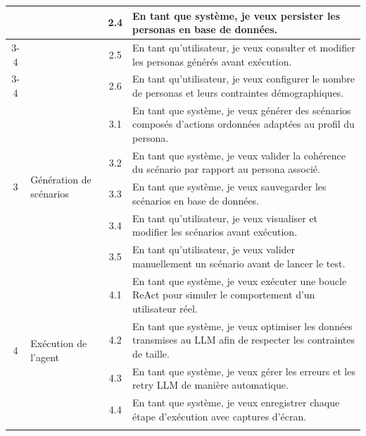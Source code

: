 \begin{center}
\begin{longtable}{|c|p{3.5cm}|c|p{7cm}|}
& & 2.4 & En tant que système, je veux persister les personas en base de données. \\ \cline{3-4}

& & 2.5 & En tant qu'utilisateur, je veux consulter et modifier les personas générés avant exécution. \\ \cline{3-4}

& & 2.6 & En tant qu'utilisateur, je veux configurer le nombre de personas et leurs contraintes démographiques. \\

\hline

\multirow{5}{*}{3} & 
\multirow{5}{3.5cm}{Génération de scénarios} 

& 3.1 & En tant que système, je veux générer des scénarios composés d'actions ordonnées adaptées au profil du persona. \\ \cline{3-4}

& & 3.2 & En tant que système, je veux valider la cohérence du scénario par rapport au persona associé. \\ \cline{3-4}

& & 3.3 & En tant que système, je veux sauvegarder les scénarios en base de données. \\ \cline{3-4}

& & 3.4 & En tant qu'utilisateur, je veux visualiser et modifier les scénarios avant exécution. \\ \cline{3-4}

& & 3.5 & En tant qu'utilisateur, je veux valider manuellement un scénario avant de lancer le test. \\

\hline

\multirow{6}{*}{4} & 
\multirow{6}{3.5cm}{Exécution de l'agent} 

& 4.1 & En tant que système, je veux exécuter une boucle ReAct pour simuler le comportement d'un utilisateur réel. \\ \cline{3-4}

& & 4.2 & En tant que système, je veux optimiser les données transmises au LLM afin de respecter les contraintes de taille. \\ \cline{3-4}

& & 4.3 & En tant que système, je veux gérer les erreurs et les retry LLM de manière automatique. \\ \cline{3-4}

& & 4.4 & En tant que système, je veux enregistrer chaque étape d'exécution avec captures d'écran. \\ \cline{3-4}


\end{longtable}
\end{center}
